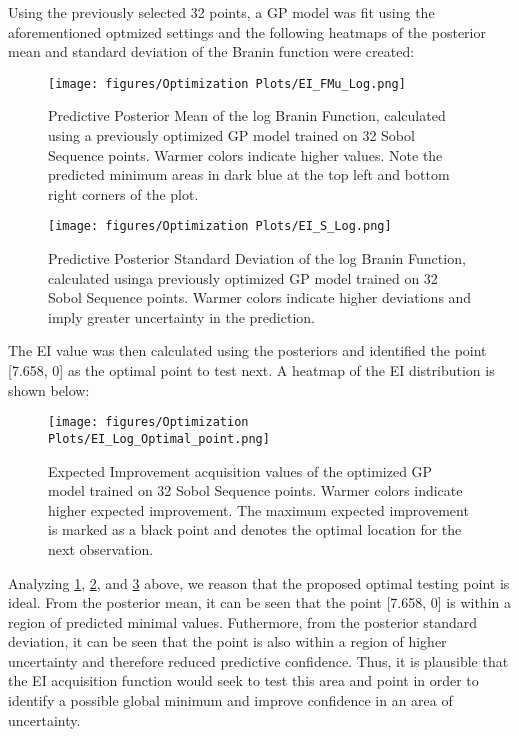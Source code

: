 \documentclass[11pt]{article}
\numberwithin{equation}{section}
\begin{document}
Using the previously selected 32 points, a GP model was fit using the aforementioned optmized settings and the following heatmaps of the posterior mean and standard deviation of the Branin function were created:

\begin{figure}[H]
  \centering
  \texttt{[image: figures/Optimization Plots/EI\_FMu\_Log.png]}
  \caption{Predictive Posterior Mean of the log Branin Function, calculated using a previously optimized GP model trained on 32 Sobol Sequence points. 
  Warmer colors indicate higher values. Note the predicted minimum areas in dark blue at the top left and bottom right corners of the plot.}
  \label{fig:ei-fmu-log}
\end{figure}

\begin{figure}[H]
  \centering
  \texttt{[image: figures/Optimization Plots/EI\_S\_Log.png]}
  \caption{Predictive Posterior Standard Deviation of the log Branin Function, calculated usinga previously optimized GP model trained on 32 Sobol Sequence points. 
  Warmer colors indicate higher deviations and imply greater uncertainty in the prediction.}
  \label{fig:ei-fs-log}
\end{figure}

The EI value was then calculated using the posteriors and identified the point [7.658, 0] as the optimal point to test next. 
A heatmap of the EI distribution is shown below:

\begin{figure}[H]
  \centering
  \texttt{[image: figures/Optimization Plots/EI\_Log\_Optimal\_point.png]}
  \caption{Expected Improvement acquisition values of the optimized GP model trained on 32 Sobol Sequence points. Warmer colors indicate higher expected improvement. 
  The maximum expected improvement is marked as a black point and denotes the optimal location for the next observation.}
  \label{fig:ei-optimalPoint-log}
\end{figure}

Analyzing \ref{fig:ei-fmu-log}, \ref{fig:ei-fs-log}, and \ref{fig:ei-optimalPoint-log} above, we reason that the proposed optimal testing point is ideal. 
From the posterior mean, it can be seen that the point [7.658, 0] is within a region of predicted minimal values.
Futhermore, from the posterior standard deviation, it can be seen that the point is also within a region of higher uncertainty and therefore reduced predictive confidence.
Thus, it is plausible that the EI acquisition function would seek to test this area and point in order to identify a possible global minimum and improve confidence in an area of uncertainty. 
\end{document}
